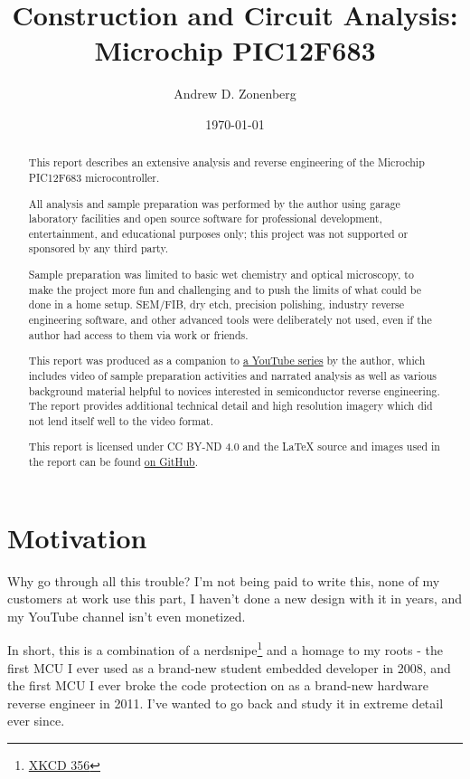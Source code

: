 \documentclass[letterpaper]{article}
\begin{document}
\title{Construction and Circuit Analysis: Microchip PIC12F683}
\author{Andrew D. Zonenberg}
\date{\today}
\maketitle

\begin{abstract}
This report describes an extensive analysis and reverse engineering of the Microchip PIC12F683 microcontroller.

All analysis and sample preparation was performed by the author using garage laboratory facilities and open source software for professional development, entertainment, and educational purposes only; this project was not supported or sponsored by any third party.

Sample preparation was limited to basic wet chemistry and optical microscopy, to make the project more fun and challenging and to push the limits of what could be done in a home setup. SEM/FIB, dry etch, precision polishing, industry reverse engineering software, and other advanced tools were deliberately not used, even if the author had access to them via work or friends.

This report was produced as a companion to \href{https://www.youtube.com/watch?v=yw8KQuswcAE&list=PLBNA3N3RCc8oRO_tnl_lnhJU61hRJ6qbU&index=1}{a YouTube series} by the author, which includes video of sample preparation activities and narrated analysis as well as various background material helpful to novices interested in semiconductor reverse engineering. The report provides additional technical detail and high resolution imagery which did not lend itself well to the video format.

This report is licensed under CC BY-ND 4.0 and the LaTeX source and images used in the report can be found
\href{https://github.com/azonenberg/pic12f683-analysis}{on GitHub}.
\end{abstract}

\pagebreak
\tableofcontents

\pagebreak
\section{Motivation}

Why go through all this trouble? I'm not being paid to write this, none of my customers at work use this part, I haven't done a new design with it in years, and my YouTube channel isn't even monetized.

In short, this is a combination of a nerdsnipe\footnote{\href{https://xkcd.com/356/}{XKCD 356}} and a homage to my roots - the first MCU I ever used as a brand-new student embedded developer in 2008, and the first MCU I ever broke the code protection on as a brand-new hardware reverse engineer in 2011. I've wanted to go back and study it in extreme detail ever since.
\end{document}
